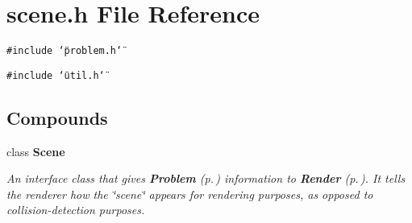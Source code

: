 \section{scene.h File Reference}
\label{scene_8h}
{\tt \#include \char`\"{}problem.h\char`\"{}}\par
{\tt \#include \char`\"{}util.h\char`\"{}}\par
\subsection*{Compounds}
\begin{CompactItemize}
\item 
class {\bf Scene}
\begin{CompactList}\small\item\em An interface class that gives {\bf Problem} {\rm (p.\,\pageref{classProblem})} information to {\bf Render} {\rm (p.\,\pageref{classRender})}. It tells the renderer how the \char`\"{}scene\char`\"{} appears for rendering purposes, as opposed to collision-detection purposes.\item\end{CompactList}\end{CompactItemize}
